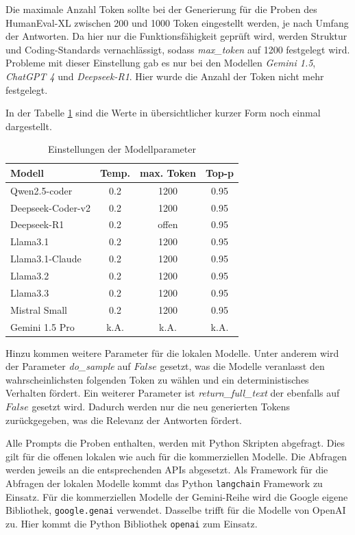 Die maximale Anzahl Token sollte bei der Generierung für die Proben des HumanEval-XL zwischen 200 und 1000 Token eingestellt werden, je nach Umfang der Antworten. Da hier nur die Funktionsfähigkeit geprüft wird, werden Struktur und Coding-Standards vernachlässigt, sodass \textit{max\_token} auf 1200 festgelegt wird. Probleme mit dieser Einstellung gab es nur bei den Modellen \textit{Gemini 1.5}, \textit{ChatGPT 4} und \textit{Deepseek-R1}. Hier wurde die Anzahl der Token nicht mehr festgelegt.\vspace{0.2cm}

In der Tabelle \ref{tab:params_for_llms} sind die Werte in übersichtlicher kurzer Form noch einmal dargestellt.

\begin{table}[!ht]
	\begin{tabular}{|l|c|c|c|}
		\hline
		\textbf{Modell} & \textbf{Temp.} & \textbf{max. Token} & \textbf{Top-p} \\
		\hline
		Qwen2.5-coder     &  0.2 &  1200 & 0.95 \\
		Deepseek-Coder-v2 &  0.2 &  1200 & 0.95 \\
		Deepseek-R1       &  0.2 & offen & 0.95 \\
		Llama3.1          &  0.2 &  1200 & 0.95 \\
		Llama3.1-Claude   &  0.2 &  1200 & 0.95 \\
		Llama3.2          &  0.2 &  1200 & 0.95 \\
		Llama3.3          &  0.2 &  1200 & 0.95 \\
		Mistral Small     &  0.2 &  1200 & 0.95 \\
		Gemini 1.5 Pro    & k.A. &  k.A. & k.A. \\
		\hline
		\hline
	\end{tabular}
	\centering
	\caption{Einstellungen der Modellparameter}
	\label{tab:params_for_llms}
\end{table}

Hinzu kommen weitere Parameter für die lokalen Modelle. Unter anderem wird der Parameter \textit{do\_sample} auf $False$ gesetzt, was die Modelle veranlasst den wahrscheinlichsten folgenden Token zu wählen und ein deterministisches Verhalten fördert. Ein weiterer Parameter ist \textit{return\_full\_text} der ebenfalls auf $False$ gesetzt wird. Dadurch werden nur die neu generierten Tokens zurückgegeben, was die Relevanz der Antworten fördert.\vspace{0.2cm}

Alle Prompts die Proben enthalten, werden mit Python Skripten abgefragt. Dies gilt für die offenen lokalen wie auch für die kommerziellen Modelle. Die Abfragen werden jeweils an die entsprechenden APIs abgesetzt. Als Framework für die Abfragen der lokalen Modelle kommt das Python \texttt{langchain} Framework zu Einsatz. Für die kommerziellen Modelle der Gemini-Reihe wird die Google eigene Bibliothek, \texttt{google.genai} verwendet. Dasselbe trifft für die Modelle von OpenAI zu. Hier kommt die Python Bibliothek \texttt{openai} zum Einsatz.

